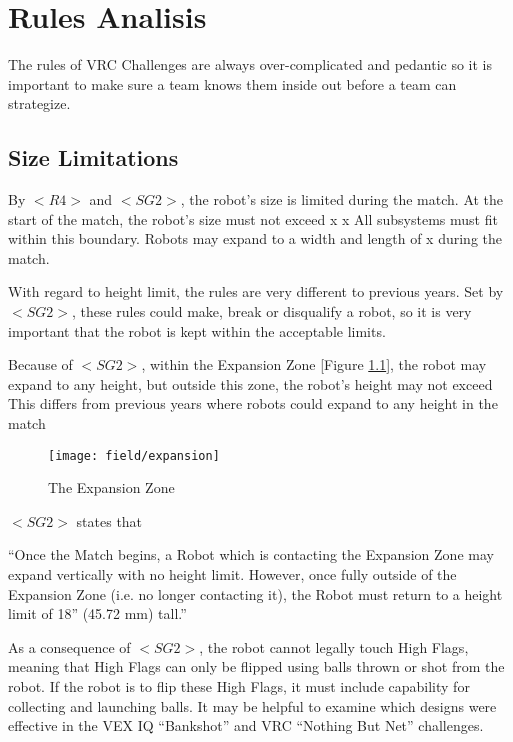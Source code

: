 \documentclass[../main.tex]{subfiles}
\begin{document}
\chapter{Rules Analisis}

The rules of VRC Challenges are always over-complicated and pedantic
so it is important to make sure a team knows them inside out before a team can
strategize.

\section{Size Limitations}

By $<R4>$ and $<SG2>$, the robot’s size is limited during the match. 
At the start of the match, the robot’s size must not exceed  x  x  
All subsystems must fit within this boundary.
Robots may expand to a width and length of  x  during the match. \par

With regard to height limit, the rules are very different to previous years.
Set by $<SG2>$, these rules could make, break or disqualify a robot,
so it is very important that the robot is kept within the acceptable limits. \par

Because of $<SG2>$, within the Expansion Zone [Figure \ref{fig:expansionzone}], the robot may expand to any height,
but outside this zone, the robot’s height may not exceed  
This differs from previous years where robots could expand to any height in the match 
\par

\begin{figure}
    \centering
    \texttt{[image: field/expansion]}
    \caption{The Expansion Zone}
    \label{fig:expansionzone}
\end{figure}

$<SG2>$ states that

``Once the Match begins, a Robot which is contacting the Expansion Zone 
may expand vertically with no height limit. However, once fully outside of the 
Expansion Zone 
(i.e. no longer contacting it), the Robot
must return to a height limit of 18” (45.72 mm) tall.''
\par

As a consequence of $<SG2>$,
the robot cannot legally touch High Flags, meaning that High Flags can only be
flipped using balls thrown or shot from the robot. If the robot is to flip these
High Flags, it must include capability for collecting and launching balls.
It may be helpful to examine which designs were effective in the VEX IQ
“Bankshot” and VRC “Nothing But Net” challenges.
\end{document}
